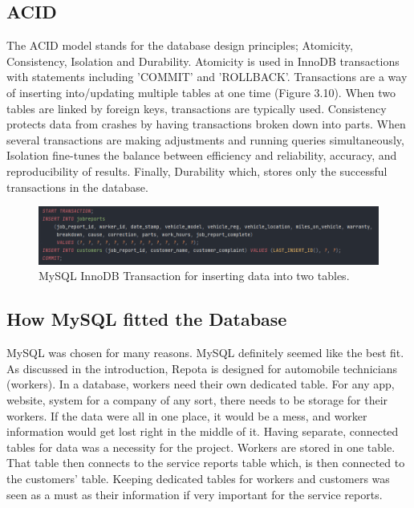 \subsection{ACID}
The ACID model stands for the database design principles; Atomicity, Consistency, Isolation and Durability. Atomicity is used in InnoDB transactions with statements including 'COMMIT' and 'ROLLBACK'. Transactions are a way of inserting into/updating multiple tables at one time (Figure 3.10). When two tables are linked by foreign keys, transactions are typically used. Consistency protects data from crashes by having transactions broken down into parts. When several transactions are making adjustments and running queries simultaneously, Isolation fine-tunes the balance between efficiency and reliability, accuracy, and reproducibility of results. Finally, Durability which, stores only the successful transactions in the database. \cite{ref19}
 
 \begin{figure}[H]
    \caption{MySQL InnoDB Transaction for inserting data into two tables.}
    \label{image:transaction}
    \centering
    \includegraphics[width=1.0\textwidth]{images/misc/mysql-transation.png}
\end{figure}

\subsection{How MySQL fitted the Database}
MySQL was chosen for many reasons. MySQL definitely seemed like the best fit. As discussed in the introduction, Repota is designed for automobile technicians (workers). In a database, workers need their own dedicated table. For any app, website, system for a company of any sort, there needs to be storage for their workers. If the data were all in one place, it would be a mess, and worker information would get lost right in the middle of it. Having separate, connected tables for data was a necessity for the project. Workers are stored in one table. That table then connects to the service reports table which, is then connected to the customers' table. Keeping dedicated tables for workers and customers was seen as a must as their information if very important for the service reports.

